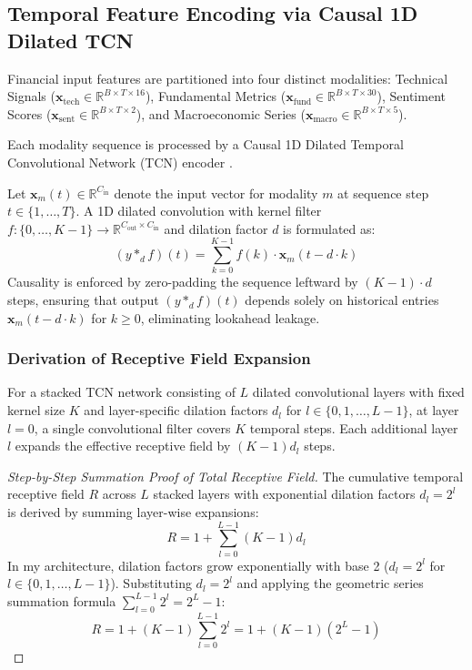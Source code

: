 \subsection{Temporal Feature Encoding via Causal 1D Dilated TCN}
\label{subsec:ch3_tcn_encoder}

Financial input features are partitioned into four distinct modalities: Technical Signals ($\mathbf{x}_{\text{tech}} \in \mathbb{R}^{B \times T \times 16}$), Fundamental Metrics ($\mathbf{x}_{\text{fund}} \in \mathbb{R}^{B \times T \times 30}$), Sentiment Scores ($\mathbf{x}_{\text{sent}} \in \mathbb{R}^{B \times T \times 2}$), and Macroeconomic Series ($\mathbf{x}_{\text{macro}} \in \mathbb{R}^{B \times T \times 5}$).

Each modality sequence is processed by a Causal 1D Dilated Temporal Convolutional Network (TCN) encoder \citep{bai2018empirical}.

Let $\mathbf{x}_m(t) \in \mathbb{R}^{C_{\text{in}}}$ denote the input vector for modality $m$ at sequence step $t \in \{1, \dots, T\}$. A 1D dilated convolution with kernel filter $f: \{0, \dots, K-1\} \to \mathbb{R}^{C_{\text{out}} \times C_{\text{in}}}$ and dilation factor $d$ is formulated as:
\begin{equation}
(y *_{d} f)(t) = \sum_{k=0}^{K-1} f(k) \cdot \mathbf{x}_m(t - d \cdot k)
\label{eq:ch3_dilated_conv}
\end{equation}
Causality is enforced by zero-padding the sequence leftward by $(K-1) \cdot d$ steps, ensuring that output $(y *_{d} f)(t)$ depends solely on historical entries $\mathbf{x}_m(t - d \cdot k)$ for $k \ge 0$, eliminating lookahead leakage.

\subsubsection{Derivation of Receptive Field Expansion}
For a stacked TCN network consisting of $L$ dilated convolutional layers with fixed kernel size $K$ and layer-specific dilation factors $d_l$ for $l \in \{0, 1, \dots, L-1\}$, at layer $l=0$, a single convolutional filter covers $K$ temporal steps. Each additional layer $l$ expands the effective receptive field by $(K-1) d_l$ steps.

\begin{proof}[Step-by-Step Summation Proof of Total Receptive Field]
The cumulative temporal receptive field $R$ across $L$ stacked layers with exponential dilation factors $d_l = 2^l$ is derived by summing layer-wise expansions:
\begin{equation}
R = 1 + \sum_{l=0}^{L-1} (K - 1) d_l
\label{eq:ch3_receptive_field_general}
\end{equation}
In my architecture, dilation factors grow exponentially with base 2 ($d_l = 2^l$ for $l \in \{0, 1, \dots, L-1\}$). Substituting $d_l = 2^l$ and applying the geometric series summation formula $\sum_{l=0}^{L-1} 2^l = 2^L - 1$:
\begin{equation}
R = 1 + (K - 1) \sum_{l=0}^{L-1} 2^l = 1 + (K - 1)(2^L - 1)
\label{eq:ch3_receptive_field_proof}
\end{equation}
\end{proof}

